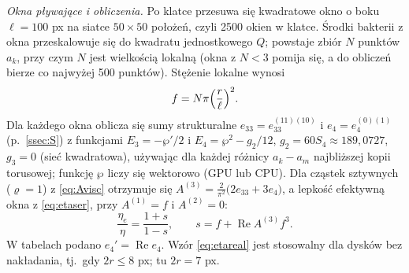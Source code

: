 \documentclass[12pt,a4paper,twoside,openright]{report}
\theoremstyle{definition}
\theoremstyle{remark}
\renewcommand{\Re}{\operatorname{Re}}
\begin{document}
\emph{Okna pływające i obliczenia.} Po klatce przesuwa się kwadratowe okno o boku $\ell=100$ px na siatce $50\times50$ położeń, czyli 2500 okien w klatce. Środki bakterii z okna przeskalowuje się do kwadratu jednostkowego $Q$; powstaje zbiór $N$ punktów $a_k$, przy czym $N$ jest wielkością lokalną (okna z $N<3$ pomija się, a do obliczeń bierze co najwyżej 500 punktów). Stężenie lokalne wynosi
\begin{equation}\label{eq:freal}
{f=N\pi\Bigl(\frac r\ell\Bigr)^2.}
\end{equation}
Dla każdego okna oblicza się sumy strukturalne $e_{33}=e_{33}^{(11)(10)}$ i $e_4=e_4^{(0)(1)}$ (p.~\ref{ssec:S}) z funkcjami $E_3=-\wp'/2$ i $E_4=\wp^2-g_2/12$, $g_2=60S_4\approx189{,}0727$, $g_3=0$ (sieć kwadratowa), używając dla każdej różnicy $a_k-a_m$ najbliższej kopii torusowej; funkcję $\wp$ liczy się wektorowo (GPU lub CPU). Dla cząstek sztywnych ($\varrho=1$) z \eqref{eq:Avisc} otrzymuje się $A^{(3)}=\frac2{\pi^2}\bigl(2e_{33}+3e_4\bigr)$, a lepkość efektywną okna z \eqref{eq:etaser}, przy $A^{(1)}=f$ i $A^{(2)}=0$:
\begin{equation}\label{eq:etareal}
{\frac{\eta_e}\eta=\frac{1+s}{1-s},\qquad s=f+\Re A^{(3)}f^3.}
\end{equation}
W tabelach podano $e_4'=\Re e_4$. Wzór \eqref{eq:etareal} jest stosowalny dla dysków bez nakładania, tj.\ gdy $2r\le 8$ px; tu $2r=7$ px.
\end{document}
